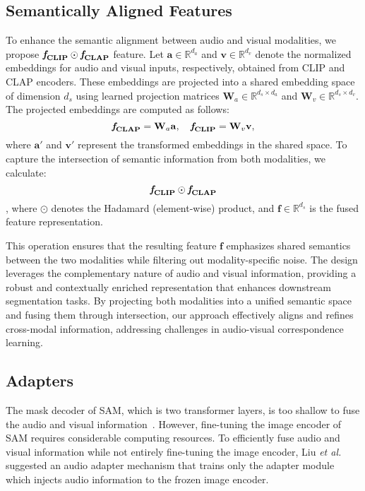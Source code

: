 \subsection{Semantically Aligned Features}
To enhance the semantic alignment between audio and visual modalities, we propose $\mathbf{\textit{\textbf{f}}_{CLIP} \odot \textit{\textbf{f}}_{CLAP}}$ feature. Let $\mathbf{a} \in \mathbb{R}^{d_a}$ and $\mathbf{v} \in \mathbb{R}^{d_v}$ denote the normalized embeddings for audio and visual inputs, respectively, obtained from CLIP\cite{radford2021clip} and CLAP\cite{elizalde2023clap} encoders. These embeddings are projected into a shared embedding space of dimension $d_s$ using learned projection matrices $\mathbf{W}_a \in \mathbb{R}^{d_s \times d_a}$ and $\mathbf{W}_v \in \mathbb{R}^{d_s \times d_v}$. The projected embeddings are computed as follows:
\[
\mathbf{\textit{\textbf{f}}_{CLAP}} = \mathbf{W}_a \mathbf{a}, \quad \mathbf{\textit{\textbf{f}}_{CLIP}} = \mathbf{W}_v \mathbf{v},
\]
where $\mathbf{a}'$ and $\mathbf{v}'$ represent the transformed embeddings in the shared space. To capture the intersection of semantic information from both modalities, we calculate:
$$
\mathbf{\textit{\textbf{f}}_{CLIP} \odot \textit{\textbf{f}}_{CLAP}} 
$$, 
where $\odot$ denotes the Hadamard (element-wise) product, and $\mathbf{f} \in \mathbb{R}^{d_s}$ is the fused feature representation.

This operation ensures that the resulting feature $\mathbf{f}$ emphasizes shared semantics between the two modalities while filtering out modality-specific noise. The design leverages the complementary nature of audio and visual information, providing a robust and contextually enriched representation that enhances downstream segmentation tasks. By projecting both modalities into a unified semantic space and fusing them through intersection, our approach effectively aligns and refines cross-modal information, addressing challenges in audio-visual correspondence learning.

\subsection{Adapters}
The mask decoder of SAM, which is two transformer layers, is too shallow to fuse the audio and visual information~\cite{liu2024annotation}. However, fine-tuning the image encoder of SAM requires considerable computing resources.
To efficiently fuse audio and visual information while not entirely fine-tuning the image encoder, Liu \textit{et al.}~\cite{liu2024annotation} suggested an audio adapter mechanism that trains only the adapter module which injects audio information to the frozen image encoder.


